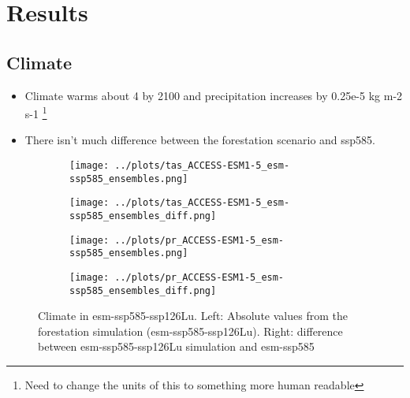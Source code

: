 \documentclass[]{article}
\begin{document}
\section{Results}

\subsection{Climate}

\begin{itemize}
    \item Climate warms about 4 \textcelsius{} by 2100 and precipitation increases by 0.25e-5 kg m-2 s-1 \footnote{Need to change the units of this to something more human readable}
    \item There isn't much difference between the forestation scenario and ssp585.
\end{itemize}

\begin{figure}[H]
    \centering
    \begin{subfigure}[b]{0.45\linewidth}
        \texttt{[image: ../plots/tas\_ACCESS-ESM1-5\_esm-ssp585\_ensembles.png]}
    \end{subfigure}
    \begin{subfigure}[b]{0.45\linewidth}
        \texttt{[image: ../plots/tas\_ACCESS-ESM1-5\_esm-ssp585\_ensembles\_diff.png]}
    \end{subfigure}
    \begin{subfigure}[b]{0.45\linewidth}
        \texttt{[image: ../plots/pr\_ACCESS-ESM1-5\_esm-ssp585\_ensembles.png]}
    \end{subfigure}
    \begin{subfigure}[b]{0.45\linewidth}
        \texttt{[image: ../plots/pr\_ACCESS-ESM1-5\_esm-ssp585\_ensembles\_diff.png]}
    \end{subfigure}
    \caption{Climate in esm-ssp585-ssp126Lu. Left: Absolute values from the forestation simulation (esm-ssp585-ssp126Lu). Right: difference between esm-ssp585-ssp126Lu simulation and esm-ssp585}
    \label{fig:climate}
\end{figure}
\end{document}
